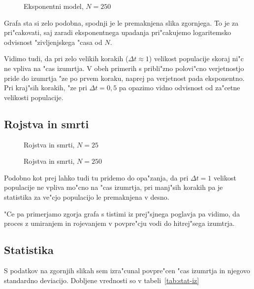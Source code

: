 \documentclass[a4paper,10pt]{article}
\begin{document}
\begin{figure}

\caption{Eksponentni model, $N=250$}
\end{figure}

Grafa sta si zelo podobna, spodnji je le premaknjena slika zgornjega. To je za pri"cakovati, saj zaradi eksponentnega upadanja pri"cakujemo logaritemsko odvisnost "zivljenjskega "casa od $N$. 

Vidimo tudi, da pri zelo velikih korakih ($\Delta t \approx 1$) velikost populacije skoraj ni"c ne vpliva na "cas izumrtja. V obeh primerih s pribli"zno polovi"cno verjetnostjo pride do izumrtja "ze po prvem koraku, naprej pa verjetnost pada eksponentno. Pri kraj"sih korakih, "ze pri $\Delta t = 0,5$ pa opazimo vidno odvisnost od za"cetne velikosti populacije. 

\subsection{Rojstva in smrti}

\begin{figure}[h!]

\caption{Rojstva in smrti, $N=25$}
\label{fig:rs-25}
\end{figure}

\begin{figure}[h!]

\caption{Rojstva in smrti, $N=250$}
\label{fig:rs-250}
\end{figure}

Podobno kot prej lahko tudi tu pridemo do opa"zanja, da pri $\Delta t = 1$ velikost populacije ne vpliva mo"cno na "cas izumrtja, pri manj"sih korakih pa je statistika za ve"cjo populacijo le premaknjena v desno. 

"Ce pa primerjamo zgorja grafa s tistimi iz prej"sjnega poglavja pa vidimo, da proces z umiranjem in rojevanjem v povpre"cju vodi do hitrej"sega izumtrja. 

\subsection{Statistika}

S podatkov na zgornjih slikah sem izra"cunal povpre"cen "cas izumrtja in njegovo standardno deviacijo. Dobljene vrednosti so v tabeli~\ref{tab:stat-iz}
\end{document}
